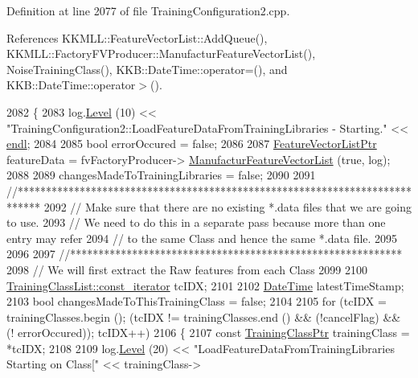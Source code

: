 Definition at line 2077 of file Training\+Configuration2.\+cpp.



References K\+K\+M\+L\+L\+::\+Feature\+Vector\+List\+::\+Add\+Queue(), K\+K\+M\+L\+L\+::\+Factory\+F\+V\+Producer\+::\+Manufactur\+Feature\+Vector\+List(), Noise\+Training\+Class(), K\+K\+B\+::\+Date\+Time\+::operator=(), and K\+K\+B\+::\+Date\+Time\+::operator$>$().


\begin{DoxyCode}
2082 \{
2083   log.\hyperlink{class_k_k_b_1_1_run_log_a32cf761d7f2e747465fd80533fdbb659}{Level} (10) << \textcolor{stringliteral}{"TrainingConfiguration2::LoadFeatureDataFromTrainingLibraries - Starting."} << 
      \hyperlink{namespace_k_k_b_ad1f50f65af6adc8fa9e6f62d007818a8}{endl};
2084 
2085   \textcolor{keywordtype}{bool}  errorOccured = \textcolor{keyword}{false};
2086 
2087   \hyperlink{class_k_k_m_l_l_1_1_feature_vector_list}{FeatureVectorListPtr}  featureData = fvFactoryProducer->
      \hyperlink{class_k_k_m_l_l_1_1_factory_f_v_producer_a96126b7adb55f6751450ede393c93086}{ManufacturFeatureVectorList} (\textcolor{keyword}{true}, log);
2088 
2089   changesMadeToTrainingLibraries = \textcolor{keyword}{false};
2090 
2091   \textcolor{comment}{//****************************************************************************}
2092   \textcolor{comment}{// Make sure that there are no existing *.data files that we are going to use.}
2093   \textcolor{comment}{// We need to do this in a separate pass because more than one entry may refer }
2094   \textcolor{comment}{// to the same Class and hence the same *.data file.}
2095 
2096 
2097   \textcolor{comment}{//***********************************************************}
2098   \textcolor{comment}{//  We will first extract the Raw features from each Class }
2099 
2100   \hyperlink{class_k_k_b_1_1_k_k_queue_aeb057c9c010446f46f57c1e355f981f1}{TrainingClassList::const\_iterator}  tcIDX;
2101 
2102   \hyperlink{class_k_k_b_1_1_date_time}{DateTime}  latestTimeStamp;
2103   \textcolor{keywordtype}{bool}      changesMadeToThisTrainingClass = \textcolor{keyword}{false};
2104 
2105   \textcolor{keywordflow}{for}  (tcIDX = trainingClasses.begin ();  (tcIDX != trainingClasses.end ()  &&  (!cancelFlag)  &&  (!
      errorOccured));  tcIDX++)
2106   \{
2107     \textcolor{keyword}{const} \hyperlink{class_k_k_m_l_l_1_1_training_class}{TrainingClassPtr} trainingClass = *tcIDX;
2108 
2109     log.\hyperlink{class_k_k_b_1_1_run_log_a32cf761d7f2e747465fd80533fdbb659}{Level} (20) << \textcolor{stringliteral}{"LoadFeatureDataFromTrainingLibraries   Starting on Class["} << trainingClass->

\end{DoxyCode}
